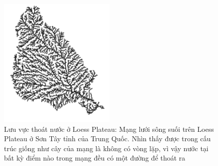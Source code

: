 \begin{figure}[ht]
\centering
\includegraphics[width=0.5\textwidth]{res/h26.png}
\caption{Lưu vực thoát nước ở Loess Plateau: Mạng lưới sông suối trên Loess Plateau ở Sơn Tây tỉnh của Trung Quốc. Nhìn thấy được trong cấu trúc giống như cây của mạng là không có vòng lặp, vì vậy nước tại bất kỳ điểm nào trong mạng đều có một đường để thoát ra}
\label{fig:h26}
\end{figure}\par
